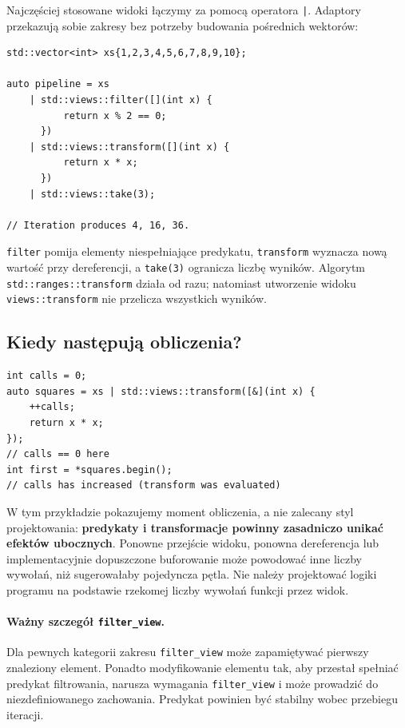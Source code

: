 Najczęściej stosowane widoki łączymy za pomocą operatora \texttt{|}.
Adaptory przekazują sobie zakresy bez potrzeby budowania pośrednich
wektorów:

\begin{lstlisting}
std::vector<int> xs{1,2,3,4,5,6,7,8,9,10};

auto pipeline = xs
    | std::views::filter([](int x) {
          return x % 2 == 0;
      })
    | std::views::transform([](int x) {
          return x * x;
      })
    | std::views::take(3);

// Iteration produces 4, 16, 36.
\end{lstlisting}

\texttt{filter} pomija elementy niespełniające predykatu,
\texttt{transform} wyznacza nową wartość przy dereferencji,
a \texttt{take(3)} ogranicza liczbę wyników. Algorytm
\texttt{std::ranges::transform} działa od razu; natomiast
utworzenie widoku \texttt{views::transform} nie przelicza
wszystkich wyników.

\subsection{Kiedy następują obliczenia?}

\begin{lstlisting}
int calls = 0;
auto squares = xs | std::views::transform([&](int x) {
    ++calls;
    return x * x;
});
// calls == 0 here
int first = *squares.begin();
// calls has increased (transform was evaluated)
\end{lstlisting}

W tym przykładzie pokazujemy moment obliczenia, a nie zalecany styl
projektowania: \textbf{predykaty i transformacje powinny zasadniczo
unikać efektów ubocznych}. Ponowne przejście widoku, ponowna
dereferencja lub implementacyjnie dopuszczone buforowanie może
powodować inne liczby wywołań, niż sugerowałaby pojedyncza pętla.
Nie należy projektować logiki programu na podstawie rzekomej liczby
wywołań funkcji przez widok.

\paragraph{Ważny szczegół \texttt{filter\_view}.}
Dla pewnych kategorii zakresu \texttt{filter\_view} może zapamiętywać
pierwszy znaleziony element. Ponadto modyfikowanie elementu tak,
aby przestał spełniać predykat filtrowania, narusza wymagania
\texttt{filter\_view} i może prowadzić do niezdefiniowanego
zachowania. Predykat powinien być stabilny wobec przebiegu iteracji.

